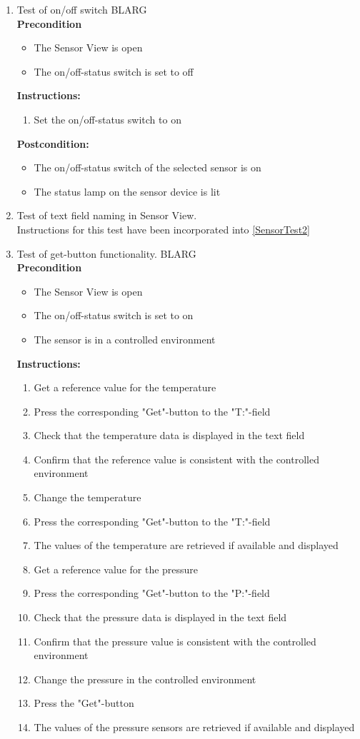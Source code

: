 \documentclass[a4paper]{article}
\newlength{\testlabellength}
\newenvironment{testlist}{\begin{enumerate}[label=\bfseries Instruction \thesubsection.\arabic* , labelindent=0pt, labelwidth=\testlabellength , leftmargin=2cm]}{\end{enumerate}}
\newenvironment{precondition}{
{\color{white}BLARG}\\ 
\textbf{Precondition}
\begin{itemize}[labelindent=0cm, labelwidth=2cm , leftmargin=1cm]
}
{\end{itemize}}
\newenvironment{instruction}{
\textbf{Instructions:}
\begin{enumerate}[label=\bfseries  \arabic*., labelindent=0cm, labelwidth=2cm , leftmargin=1cm]
}
{\end{enumerate}}
\newenvironment{postcondition}{
\textbf{Postcondition:}
\begin{itemize}[labelindent=0cm, labelwidth=2cm , leftmargin=1cm]
}
{\end{itemize}}
\begin{document}
\begin{appendices}
\begin{testlist}
	\item Test of on/off switch
		\begin{precondition}
			\item The Sensor View is open
			\item The on/off-status switch is set to off
		\end{precondition}
		\begin{instruction}
			\item Set the on/off-status switch to on
	  	\end{instruction}
	  	\begin{postcondition}
	  		\item The on/off-status switch of the selected sensor is on
	  		\item The status lamp on the sensor device is lit
	  	\end{postcondition}

	\item Test of text field naming in Sensor View. \\
		Instructions for this test have been incorporated into \ref{SensorTest2}
\newpage
	\item Test of get-button functionality.	\label{SensorTest2}
		\begin{precondition}
			\item The Sensor View is open
			\item The on/off-status switch is set to on
			\item The sensor is in a controlled environment
		\end{precondition}
		\begin{instruction}
			\item Get a reference value for the temperature
			\item Press the corresponding "Get"-button to the "T:"-field
			\item Check that the temperature data is displayed in the text field
			\item Confirm that the reference value is consistent with the controlled environment
			\item Change the temperature
			\item Press the corresponding "Get"-button to the "T:"-field
			\item The values of the temperature are retrieved if available and displayed
			
			\item Get a reference value for the pressure
			\item Press the corresponding "Get"-button to the "P:"-field
			\item Check that the pressure data is displayed in the text field
			\item Confirm that the pressure value is consistent with the controlled environment
			\item Change the pressure in the controlled environment
			\item Press the "Get"-button
			\item The values of the pressure sensors are retrieved if available and displayed
			

\end{instruction}
\end{testlist}
\end{appendices}
\end{document}
